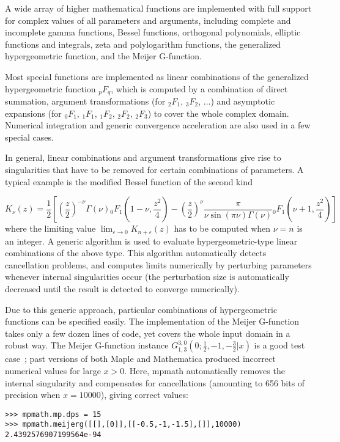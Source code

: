 A wide array of higher mathematical functions are implemented
with full support for complex values of all parameters and arguments,
including complete and incomplete gamma functions,
Bessel functions, orthogonal polynomials, elliptic functions and integrals,
zeta and polylogarithm functions,
the generalized hypergeometric function, and the Meijer G-function.

Most special functions are implemented as linear
combinations of the generalized hypergeometric function ${}_{p}F_{q}$,
which is computed by a combination of direct summation,
argument transformations (for ${}_2F_1$, ${}_3F_2$, $\ldots$)
and asymptotic expansions
(for ${}_0F_1$, ${}_1F_1$, ${}_1F_2$, ${}_2F_2$, ${}_2F_3$)
to cover the whole complex domain.
Numerical integration and generic convergence acceleration
are also used in a few special cases.

In general, linear combinations and argument transformations
give rise to singularities that have to be removed for certain
combinations of parameters.
A typical example is the modified Bessel function of the second kind

$$K_{\nu}(z) = \frac{1}{2} \left[
            {\left(\frac{z}{2}\right)}^{-\nu}
                \Gamma(\nu)
                {}_0F_1\!\left(1-\nu, \frac{z^2}{4}\right)
             -
             {\left(\frac{z}{2}\right)}^{\nu}
                 \frac{\pi}{\nu \sin(\pi \nu) \Gamma(\nu)}
                 {}_0F_1\!\left(\nu+1, \frac{z^2}{4}\right)
            \right]$$
where the limiting value $\lim_{\varepsilon \to 0} K_{n+\varepsilon}(z)$
has to be computed when $\nu = n$ is an integer.
A generic algorithm is used to evaluate
hypergeometric-type linear combinations of the above type.
This algorithm automatically detects cancellation problems,
and computes limits numerically by perturbing parameters whenever
internal singularities occur (the perturbation size is automatically
decreased until the result is detected to converge numerically).

Due to this generic approach, particular combinations of hypergeometric
functions can be specified easily.
The implementation of the Meijer G-function takes only a few dozen lines of
code, yet covers the whole input domain in a robust way.
The Meijer G-function instance
$G_{1, 3}^{3, 0}\left(0 ; \tfrac{1}{2}, -1, - \tfrac{3}{2} | x \right)$
is a good test case~\cite{Toth2007}; past versions of both Maple and
Mathematica produced incorrect numerical values for large $x > 0$.
Here, mpmath automatically removes the internal singularity
and compensates for cancellations (amounting to 656 bits
of precision when $x = 10000$), giving correct values:
\begin{verbatim}
>>> mpmath.mp.dps = 15
>>> mpmath.meijerg([[],[0]],[[-0.5,-1,-1.5],[]],10000)
2.4392576907199564e-94
\end{verbatim}

